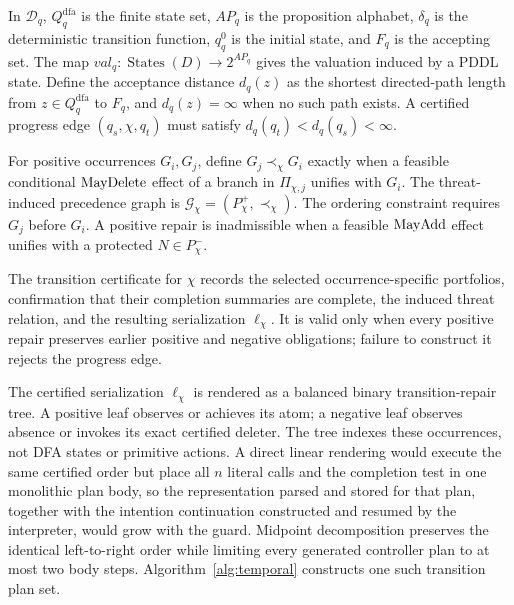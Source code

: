 In $\mathcal D_q$, $Q_q^{\mathrm{dfa}}$ is the finite state set, $AP_q$ is the
proposition alphabet, $\delta_q$ is the deterministic transition function,
$q_q^0$ is the initial state, and $F_q$ is the accepting set. The map
$\mathit{val}_q:\operatorname{States}(D)\rightarrow 2^{AP_q}$ gives the
valuation induced by a PDDL state. Define the acceptance distance
$d_q(z)$ as the shortest directed-path length from
$z\in Q_q^{\mathrm{dfa}}$ to $F_q$, and $d_q(z)=\infty$ when no such path
exists. A certified progress edge $(q_s,\chi,q_t)$ must satisfy
$d_q(q_t)<d_q(q_s)<\infty$.

\begin{definition}
For positive occurrences $G_i,G_j$, define
$G_j\prec_\chi G_i$ exactly when a feasible conditional $\mathrm{MayDelete}$ effect of
a branch
in $\Pi_{\chi,j}$ unifies with $G_i$. The threat-induced precedence graph is
$\mathcal G_\chi=(P_\chi^+,\prec_\chi)$. The ordering constraint requires $G_j$
before $G_i$. A positive repair is inadmissible when a feasible $\mathrm{MayAdd}$ effect
unifies with a protected $N\in P_\chi^-$.
\end{definition}

The transition certificate for $\chi$ records the selected occurrence-specific
portfolios, confirmation that their completion summaries are complete, the
induced threat relation, and the resulting serialization
$\boldsymbol\ell_\chi$. It is valid only when every positive repair preserves
earlier positive and negative obligations; failure to construct it rejects the
progress edge.

The certified serialization $\boldsymbol\ell_\chi$ is rendered as a balanced
binary transition-repair tree. A positive leaf observes or achieves its atom; a
negative leaf observes absence or invokes its exact certified deleter. The tree
indexes these occurrences, not DFA states or primitive actions. A direct linear
rendering would execute the same certified order but place all $n$ literal calls
and the completion test in one monolithic plan body, so the representation
parsed and stored for that plan, together with the intention continuation
constructed and resumed by the interpreter, would grow with the guard. Midpoint
decomposition preserves the identical left-to-right order while limiting every
generated controller plan to at most two body steps. Algorithm~\ref{alg:temporal}
constructs one such transition plan set.


